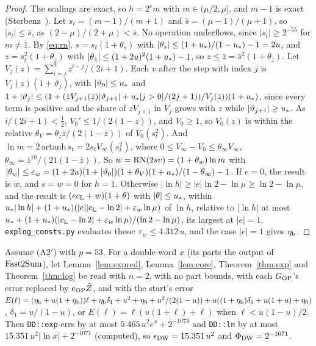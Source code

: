 \begin{proof}
The scalings are exact, so $h = 2^em$ with $m \in (\mu/2, \mu]$, and $m - 1$ is exact (Sterbenz~\cite{Sterbenz74}). Let $s_t = (m-1)/(m
+ 1)$ and $\bar s = (\mu - 1)/(\mu + 1)$, so $|s_t| \le \bar s$, as $(2 - \mu)/(2 + \mu) < \bar s$. No
operation underflows, since $|s_t| \ge 2^{-55}$ for $m \ne 1$. By \eqref{eq:rn}, $s = s_t(1 + \theta_s)$ with
$|\theta_s| \le (1 + u_{*})/(1 - u_{*}) - 1 = 2u$, and $z = s_t^2(1 + \theta_z)$ with $|\theta_z| \le (1 + 2u)^2(1 + u_{*})
- 1$, so $z \le \bar z = \bar s^2(1 + \theta_z)$. Let $V_j(z) = \sum_{i=j}^9z^{i-j}/(2i+1)$. Each $v$ after the
step with index $j$ is $V_j(z)(1 + \vartheta_j)$, with $|\vartheta_9| \le u_{*}$ and $1 + |\vartheta_j| \le (1 + (\bar
zV_{j+1}(\bar z)|\vartheta_{j+1}| + u_{*}[j > 0]/(2j+1))/V_j(\bar z))(1 + u_{*})$, since every term is positive and the
share of $zV_{j+1}$ in $V_j$ grows with $z$ while $|\vartheta_{j+1}| \ge u_{*}$. As $i/(2i+1) < \frac12$, $V_0' \le 1/(2(1
- z))$, and $V_0 \ge 1$, so $V_0(z)$ is within the relative $\theta_V = \theta_z\bar z/(2(1 - \bar z))$ of
$V_0(s_t^2)$. And $\ln m = 2\,\mathrm{artanh}\,s_t = 2s_tV_\infty(s_t^2)$, where $0 \le V_\infty - V_0 \le \theta_\infty
V_\infty$, $\theta_\infty = \bar z^{10}/(21(1 - \bar z))$. So $w = \mathrm{RN}(2sv) = (1 + \theta_w)\ln m$ with $|\theta_w| \le
\varepsilon_w = (1 + 2u)(1 + |\vartheta_0|)(1 + \theta_V)(1 + u_{*})/(1 - \theta_\infty) - 1$. If $e = 0$, the result is $w$, and
$s = w = 0$ for $h = 1$. Otherwise $|\ln h| \ge |e|\ln 2 - \ln\mu \ge \ln 2 - \ln\mu$, and the result is $(ec_{\rm L} +
w)(1 + \theta)$ with $|\theta| \le u_{*}$, within $u_{*}|\ln h| + (1 + u_{*})(|e||c_{\rm L} - \ln 2| + \varepsilon_w\ln\mu)$
of $\ln h$, relative to $|\ln h|$ at most $u_{*} + (1 + u_{*})(|c_{\rm L} - \ln 2| + \varepsilon_w\ln\mu)/(\ln 2 -
\ln\mu)$, its largest at $|e| = 1$. \texttt{explog\_consts.py} evaluates these: $\varepsilon_w \le 4.312\,u$, and the
case $|e| = 1$ gives $\eta_{\rm b}$.
\end{proof}

\begin{proposition}\label{prop:ddexplog}
Assume (A2$'$) with $p = 53$. For a double-word $x$ (its parts the output of $\mathrm{Fast2Sum}$), let
Lemma~\ref{lem:expred}, Lemma~\ref{lem:core}, Theorem~\ref{thm:exp} and Theorem~\ref{thm:log} be read with $n = 2$, with no
part bounds, with each $G_{\rm OP}$'s error replaced by $e_{\rm OP}\bar Z$, and with the start's error $E(\ell) =
(\eta_{\rm b} + u(1 + \eta_{\rm b}))\ell + \eta_{\rm b}\delta_1 + u^2 + \eta_0 + u^2/(2(1-u)) + u((1 + \eta_{\rm
b})\delta_1 + u(1+u) + \eta_0)$, $\delta_1 = u/(1-u)$, or $E(\ell) = \ell(u(1+\ell) + \ell)$ when $\ell < u(1-u)/2$.
Then \texttt{DD::exp} errs by at most $5.465\,u^2e^x + 2^{-1073}$ and \texttt{DD::ln} by at most
$15.351\,u^2|\ln x| + 2^{-1071}$ (computed), so $\epsilon_{\rm DW} = 15.351\,u^2$ and $\Phi_{\rm DW} =
2^{-1071}$.
\end{proposition}

